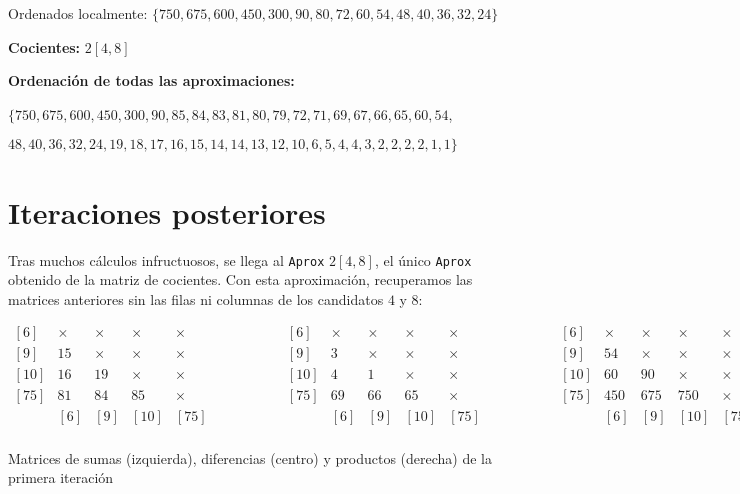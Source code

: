 Ordenados localmente: $\{750,675,600,450,300,90,80,72,60,54,48,40,36,32,24\}$

\textbf{Cocientes:} $2[4,8]$

\textbf{Ordenación de todas las aproximaciones:}

\begin{center}
$\{750,675,600,450,300,90,85,84,83,81,80,79,72,71,69,67,66,65,60,54$,

$48,40,36,32,24,19,18,17,16,15,14,14,13,12,10,6,5,4,4,3,2,2,2,2,1,1\}$
\end{center}

\section{Iteraciones posteriores}

Tras muchos cálculos infructuosos, se llega al \texttt{Aprox} $2[4,8]$, el único \texttt{Aprox} obtenido de la matriz de cocientes.
Con esta aproximación, recuperamos las matrices anteriores sin las filas ni columnas de los candidatos $4$ y $8$:

\begin{center}
$\begin{matrix}
[6]  & \times & \times & \times & \times \\
[9]  & 15     & \times & \times & \times \\
[10] & 16     & 19     & \times & \times \\
[75] & 81     & 84     & 85     & \times \\
     &   [6]  &   [9]  &  [10]  &  [75]  \\
\end{matrix}
\ \ \ \ \ \ \ \ \ \ \ \ \ \ \ \ \ \ \ \ \ \ \begin{matrix}
[6]  & \times & \times & \times & \times \\
[9]  & 3      & \times & \times & \times \\
[10] & 4      & 1      & \times & \times \\
[75] & 69     & 66     & 65     & \times \\
     &   [6]  &   [9]  &  [10]  &  [75]  \\
\end{matrix}
\ \ \ \ \ \ \ \ \ \ \ \ \ \ \ \ \ \ \ \ \ \ \begin{matrix}
[6]  & \times & \times & \times & \times \\
[9]  & 54     & \times & \times & \times \\
[10] & 60     & 90     & \times & \times \\
[75] & 450    & 675    & 750    & \times \\
     &   [6]  &   [9]  &  [10]  &  [75]  \\
\end{matrix}$

Matrices de sumas (izquierda), diferencias (centro) y productos (derecha) de la primera iteración
\end{center}

